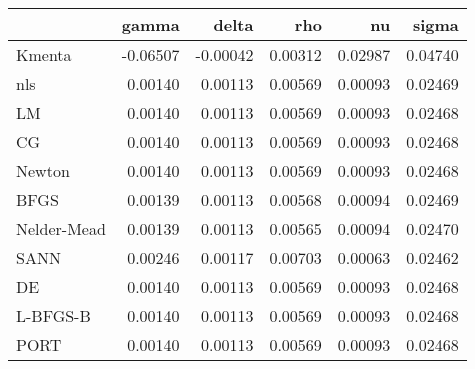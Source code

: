 \begin{tabular}{lrrrrr}
  \hline
 & gamma & delta & rho & nu & sigma \\ 
  \hline
Kmenta & -0.06507 & -0.00042 & 0.00312 & 0.02987 & 0.04740 \\ 
  nls & 0.00140 & 0.00113 & 0.00569 & 0.00093 & 0.02469 \\ 
  LM & 0.00140 & 0.00113 & 0.00569 & 0.00093 & 0.02468 \\ 
  CG & 0.00140 & 0.00113 & 0.00569 & 0.00093 & 0.02468 \\ 
  Newton & 0.00140 & 0.00113 & 0.00569 & 0.00093 & 0.02468 \\ 
  BFGS & 0.00139 & 0.00113 & 0.00568 & 0.00094 & 0.02469 \\ 
  Nelder-Mead & 0.00139 & 0.00113 & 0.00565 & 0.00094 & 0.02470 \\ 
  SANN & 0.00246 & 0.00117 & 0.00703 & 0.00063 & 0.02462 \\ 
  DE & 0.00140 & 0.00113 & 0.00569 & 0.00093 & 0.02468 \\ 
  L-BFGS-B & 0.00140 & 0.00113 & 0.00569 & 0.00093 & 0.02468 \\ 
  PORT & 0.00140 & 0.00113 & 0.00569 & 0.00093 & 0.02468 \\ 
   \hline
\end{tabular}
